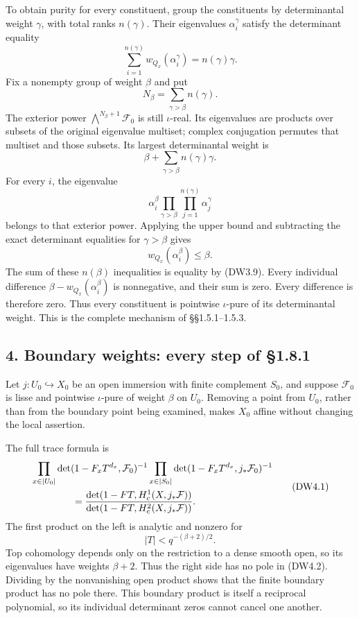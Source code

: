 To obtain purity for every constituent, group the constituents by
determinantal weight \(\gamma\), with total ranks \(n(\gamma)\). Their
eigenvalues \(\alpha_i^\gamma\) satisfy the determinant equality \[
\sum_{i=1}^{n(\gamma)}w_{Q_x}(\alpha_i^\gamma)=n(\gamma)\gamma.
\tag{DW3.9}
\] Fix a nonempty group of weight \(\beta\) and put \[
N_\beta=\sum_{\gamma>\beta}n(\gamma).
\tag{DW3.10}
\] The exterior power \(\bigwedge^{N_\beta+1}\mathcal F_0\) is still
\(\iota\)-real. Its eigenvalues are products over subsets of the
original eigenvalue multiset; complex conjugation permutes that multiset
and those subsets. Its largest determinantal weight is \[
\beta+\sum_{\gamma>\beta}n(\gamma)\gamma.
\tag{DW3.11}
\] For every \(i\), the eigenvalue \[
\alpha_i^\beta\prod_{\gamma>\beta}\prod_{j=1}^{n(\gamma)}\alpha_j^\gamma
\tag{DW3.12}
\] belongs to that exterior power. Applying the upper bound and
subtracting the exact determinant equalities for \(\gamma>\beta\) gives
\[
w_{Q_x}(\alpha_i^\beta)\le\beta.
\tag{DW3.13}
\] The sum of these \(n(\beta)\) inequalities is equality by (DW3.9).
Every individual difference \(\beta-w_{Q_x}(\alpha_i^\beta)\) is
nonnegative, and their sum is zero. Every difference is therefore zero.
Thus every constituent is pointwise \(\iota\)-pure of its determinantal
weight. This is the complete mechanism of §§1.5.1--1.5.3.

\subsection{4. Boundary weights: every step of
§1.8.1}\label{boundary-weights-every-step-of-1.8.1}

Let \(j:U_0\hookrightarrow X_0\) be an open immersion with finite
complement \(S_0\), and suppose \(\mathcal F_0\) is lisse and pointwise
\(\iota\)-pure of weight \(\beta\) on \(U_0\). Removing a point from
\(U_0\), rather than from the boundary point being examined, makes
\(X_0\) affine without changing the local assertion.

The full trace formula is \[
\begin{aligned}
&\prod_{x\in|U_0|}
\det(1-F_xT^{d_x},\mathcal F_0)^{-1}
\prod_{x\in|S_0|}
\det(1-F_xT^{d_x},j_*\mathcal F_0)^{-1}\\
&\hspace{15mm}
=\frac{\det(1-FT,H_c^1(X,j_*\mathcal F))}
{\det(1-FT,H_c^2(X,j_*\mathcal F))}.
\end{aligned}
\tag{DW4.1}
\] The first product on the left is analytic and nonzero for \[
|T|<q^{-(\beta+2)/2}.
\tag{DW4.2}
\] Top cohomology depends only on the restriction to a dense smooth
open, so its eigenvalues have weights \(\beta+2\). Thus the right side
has no pole in (DW4.2). Dividing by the nonvanishing open product shows
that the finite boundary product has no pole there. This boundary
product is itself a reciprocal polynomial, so its individual determinant
zeros cannot cancel one another.

